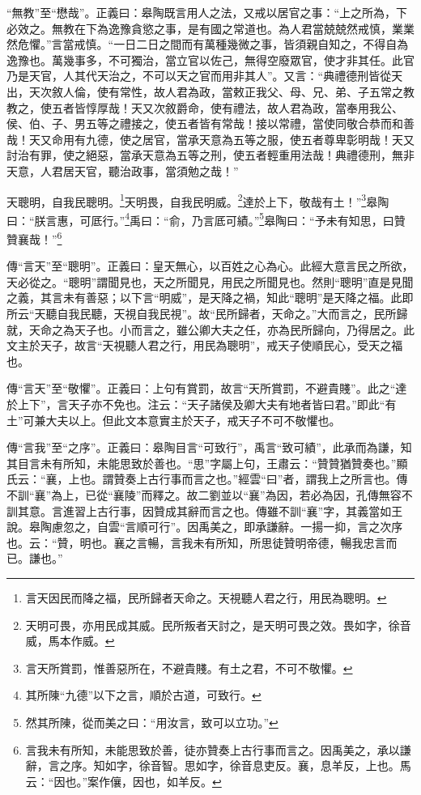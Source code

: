 {\noindent\shu{}\fzkt “無教”至“懋哉”。正義曰：皋陶既言用人之法，又戒以居官之事：“上之所為，下必效之。無教在下為逸豫貪慾之事，是有國之常道也。為人君當兢兢然戒慎，業業然危懼。”言當戒慎。“一日二日之間而有萬種幾微之事，皆須親自知之，不得自為逸豫也。萬幾事多，不可獨治，當立官以佐己，無得空廢眾官，使才非其任。此官乃是天官，人其代天治之，不可以天之官而用非其人”。又言：“典禮德刑皆從天出，天次敘人倫，使有常性，故人君為政，當敕正我父、母、兄、弟、子五常之教教之，使五者皆惇厚哉！天又次敘爵命，使有禮法，故人君為政，當奉用我公、侯、伯、子、男五等之禮接之，使五者皆有常哉！接以常禮，當使同敬合恭而和善哉！天又命用有九德，使之居官，當承天意為五等之服，使五者尊卑彰明哉！天又討治有罪，使之絕惡，當承天意為五等之刑，使五者輕重用法哉！典禮德刑，無非天意，人君居天官，聽治政事，當須勉之哉！” \par}

天聰明，自我民聰明。\footnote{言天因民而降之福，民所歸者天命之。天視聽人君之行，用民為聰明。}天明畏，自我民明威。\footnote{天明可畏，亦用民成其威。民所叛者天討之，是天明可畏之效。畏如字，徐音威，馬本作威。}達於上下，敬哉有土！”\footnote{言天所賞罰，惟善惡所在，不避貴賤。有土之君，不可不敬懼。}皋陶曰：“朕言惠，可厎行。”\footnote{其所陳“九德”以下之言，順於古道，可致行。}禹曰：“俞，乃言厎可績。”\footnote{然其所陳，從而美之曰：“用汝言，致可以立功。”}皋陶曰：“予未有知思，曰贊贊襄哉！”\footnote{言我未有所知，未能思致於善，徒亦贊奏上古行事而言之。因禹美之，承以謙辭，言之序。知如字，徐音智。思如字，徐音息吏反。襄，息羊反，上也。馬云：“因也。”案作儴，因也，如羊反。}

{\noindent\zhuan{}\fzbyks 傳“言天”至“聰明”。正義曰：皇天無心，以百姓之心為心。此經大意言民之所欲，天必從之。“聰明”謂聞見也，天之所聞見，用民之所聞見也。然則“聰明”直是見聞之義，其言未有善惡；以下言“明威”，是天降之禍，知此“聰明”是天降之福。此即所云“天聽自我民聽，天視自我民視”。故“民所歸者，天命之。”大而言之，民所歸就，天命之為天子也。小而言之，雖公卿大夫之任，亦為民所歸向，乃得居之。此文主於天子，故言“天視聽人君之行，用民為聰明”，戒天子使順民心，受天之福也。 \par}

{\noindent\zhuan{}\fzbyks 傳“言天”至“敬懼”。正義曰：上句有賞罰，故言“天所賞罰，不避貴賤”。此之“達於上下”，言天子亦不免也。注云：“天子諸侯及卿大夫有地者皆曰君。”即此“有土”可兼大夫以上。但此文本意實主於天子，戒天子不可不敬懼也。 \par}

{\noindent\zhuan{}\fzbyks 傳“言我”至“之序”。正義曰：皋陶目言“可致行”，禹言“致可績”，此承而為謙，知其目言未有所知，未能思致於善也。“思”字屬上句，王肅云：“贊贊猶贊奏也。”顯氏云：“襄，上也。謂贊奏上古行事而言之也。”經雲“曰”者，謂我上之所言也。傳不訓“襄”為上，已從“襄陵”而釋之。故二劉並以“襄”為因，若必為因，孔傳無容不訓其意。言進習上古行事，因贊成其辭而言之也。傳雖不訓“襄”字，其義當如王說。皋陶慮忽之，自雲“言順可行”。因禹美之，即承謙辭。一揚一抑，言之次序也。云：“贊，明也。襄之言暢，言我未有所知，所思徒贊明帝德，暢我忠言而已。謙也。” \par}

